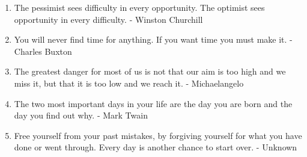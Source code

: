 \begin{enumerate}
            \item The pessimist sees difficulty in every opportunity. The optimist sees opportunity in every difficulty. - Winston Churchill
            \item You will never find time for anything. If you want time you must make it. - Charles Buxton
            \item The greatest danger for most of us is not that our aim is too high and we miss it, but that it is too low and we reach it. - Michaelangelo
            \item The two most important days in your life are the day you are born and the day you find out why. - Mark Twain
            \item Free yourself from your past mistakes, by forgiving yourself for what you have done or went through. Every day is another chance to start over. - Unknown
        \end{enumerate}

